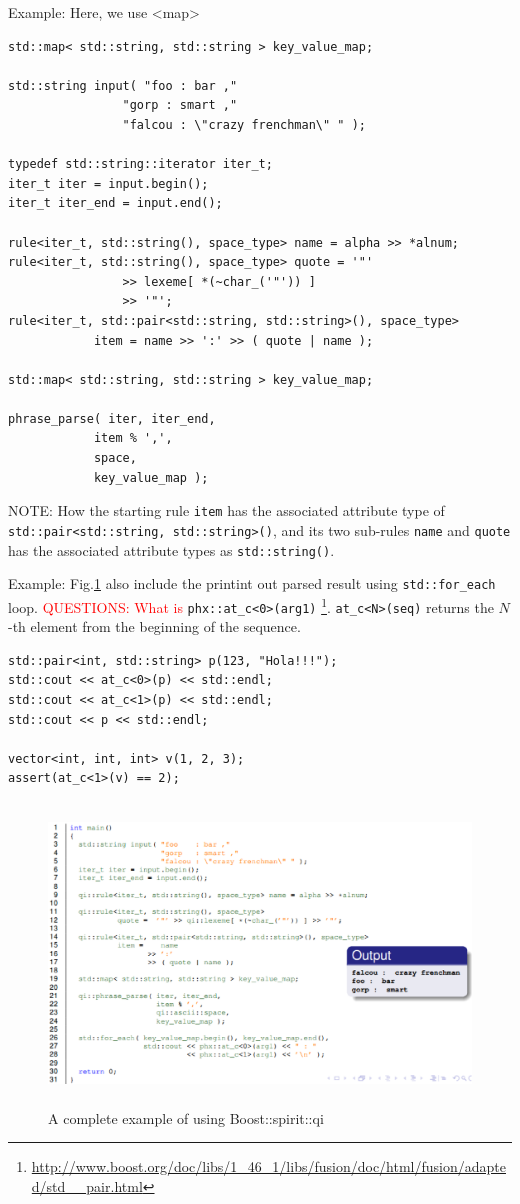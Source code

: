 Example: Here, we use <map>
\begin{verbatim}
std::map< std::string, std::string > key_value_map;

std::string input( "foo : bar ,"
				"gorp : smart ,"
				"falcou : \"crazy frenchman\" " );

typedef std::string::iterator iter_t;
iter_t iter = input.begin();
iter_t iter_end = input.end();

rule<iter_t, std::string(), space_type> name = alpha >> *alnum;
rule<iter_t, std::string(), space_type> quote = '"'
				>> lexeme[ *(~char_('"')) ]
				>> '"';
rule<iter_t, std::pair<std::string, std::string>(), space_type>
			item = name >> ':' >> ( quote | name );

std::map< std::string, std::string > key_value_map;

phrase_parse( iter, iter_end,
			item % ',',
			space,
			key_value_map );
\end{verbatim}
NOTE: How the starting rule \verb!item! has the associated attribute type of
\verb!std::pair<std::string, std::string>()!, and its two sub-rules \verb!name!
and \verb!quote! has the associated attribute types as \verb!std::string()!.

Example: Fig.\ref{fig:Boost_Spirit_example_1} also include the printint out
parsed result using \verb!std::for_each! loop. \textcolor{red}{QUESTIONS: What
is }\verb!phx::at_c<0>(arg1)!
\footnote{\url{http://www.boost.org/doc/libs/1_46_1/libs/fusion/doc/html/fusion/adapted/std__pair.html}}.
\verb!at_c<N>(seq)! returns the $N$-th element from the beginning of the
sequence.

\begin{verbatim}
std::pair<int, std::string> p(123, "Hola!!!");
std::cout << at_c<0>(p) << std::endl;
std::cout << at_c<1>(p) << std::endl;
std::cout << p << std::endl;

vector<int, int, int> v(1, 2, 3);
assert(at_c<1>(v) == 2);
\end{verbatim}


\begin{figure}[hbt]
  \centerline{\includegraphics[height=8cm,
    angle=0]{./images/Boost_Spirit_example_1.eps}}
\caption{A complete example of using Boost::spirit::qi}
\label{fig:Boost_Spirit_example_1}
\end{figure}


